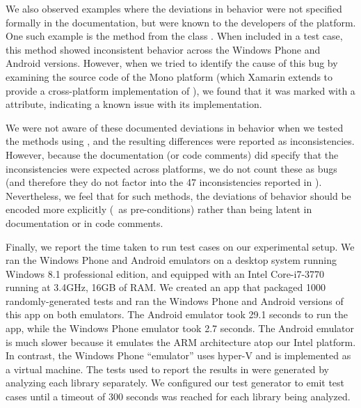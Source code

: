 \begin{mylist}
We also observed examples where the deviations in behavior were not specified
formally in the documentation, but were known to the developers of the
platform. One such example is the method  from the
class . When included in a test case, this method
showed inconsistent behavior across the Windows Phone and Android versions.
However, when we tried to identify the cause of this bug by examining the
source code of the Mono platform (which Xamarin extends to provide a
cross-platform implementation of ), we found that it was marked with
a  attribute, indicating a known issue with its implementation.

We were not aware of these documented deviations in behavior when we tested the
methods using \tool, and the resulting differences were reported as
inconsistencies. However, because the documentation (or code comments) did
specify that the inconsistencies were expected across platforms, we do not
count these as bugs (and therefore they do not factor into the 47
inconsistencies reported in ).  Nevertheless, we
feel that for such methods, the deviations of behavior should be encoded more
explicitly (\eg~as pre-conditions) rather than being latent in documentation or
in code comments.
%
\end{mylist}


%
Finally, we report the time taken to run test cases on our experimental setup.
We ran the Windows Phone and Android emulators on a desktop system running
Windows 8.1 professional edition, and equipped with an Intel Core-i7-3770
running at 3.4GHz, 16GB of RAM. We created an app that packaged 1000
randomly-generated tests and ran the Windows Phone and Android versions of this
app on both emulators. The Android emulator took 29.1 seconds to run the app,
while the Windows Phone emulator took 2.7 seconds. The Android emulator is much
slower because it emulates the ARM architecture atop our Intel platform. In
contrast, the Windows Phone ``emulator'' uses hyper-V and is implemented as a
virtual machine. The tests used to report the results in
 were generated by analyzing each library
separately. We configured our test generator to emit test cases until a timeout
of 300 seconds was reached for each library being analyzed.
